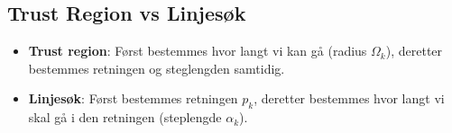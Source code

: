 \subsection{Trust Region vs Linjesøk}

\begin{itemize}
	\item \textbf{Trust region}: Først bestemmes hvor langt vi kan gå (radius \( \Omega_k \)), deretter bestemmes retningen og steglengden samtidig.
	\item \textbf{Linjesøk}: Først bestemmes retningen \( p_k \), deretter bestemmes hvor langt vi skal gå i den retningen (steplengde \( \alpha_k \)).
\end{itemize}
